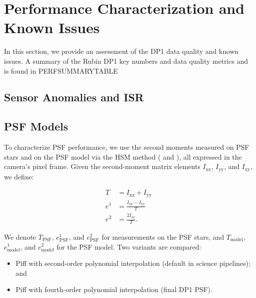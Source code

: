 \section{Performance Characterization and Known Issues
\label{sec:performance}}
%
In this section, we provide an assessment of the \gls{DP1}
data quality and known issues.
A summary of the Rubin \gls{DP1} key numbers and data quality metrics and is found in PERFSUMMARYTABLE
%

\subsection{Sensor Anomalies and ISR}
\label{ssec:sensor_anomalies}


\subsection{PSF Models
\label{ssec:psf_models}}

To characterize \gls{PSF} performance, we use the second moments measured on \gls{PSF} stars
and on the PSF model via the \gls{HSM} method  (\citealt{2003MNRAS.343..459H} and
\citealt{2005MNRAS.361.1287M}), all expressed in the camera’s
pixel frame. Given the second-moment matrix elements $I_{\text{xx}}$,
$I_{\text{yy}}$, and $I_{\text{xy}}$, we define:

\begin{align*}
T &= I_{\text{xx}} + I_{\text{yy}} \\
e^1 &= \frac{I_{\text{xx}} - I_{\text{yy}}}{T} \\
e^2 &= \frac{2 I_{\text{xy}}}{T}.
\end{align*}

\noindent We denote $T_{\text{PSF}}$, $e^1_{\text{PSF}}$, and $e^2_{\text{PSF}}$ for
measurements on the \gls{PSF} stars, and $T_{\text{model}}$, $e^1_{\text{model}}$,
and $e^2_{\text{model}}$ for the \gls{PSF} model. Two variants are compared:

\begin{itemize}
\item Piff with second-order polynomial interpolation (default in science pipelines); and
\item Piff with fourth-order polynomial interpolation (final \gls{DP1} \gls{PSF}).
\end{itemize}

